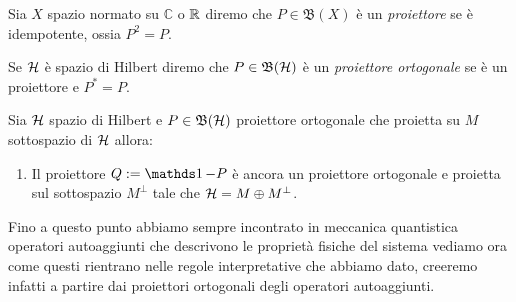 \begin{definition}
Sia $X$ spazio normato su $\mathbb{C}$ o $\operatorname{\mathbb{R}}$ diremo che $P \in \mathfrak{B}(X)$ è un \emph{proiettore} se è idempotente, ossia $P^2 = P$.
\end{definition}

\begin{definition}
    Se $\operatorname{\mathcal{H}}$ è spazio di Hilbert diremo che $P \in \mathfrak{B}(\operatorname{\mathcal{H}})$ è un \emph{proiettore ortogonale} se è un proiettore e $P^* = P$.
\end{definition}

\begin{proposition}
    Sia $\operatorname{\mathcal{H}}$ spazio di Hilbert e $P \in \mathfrak{B}(\operatorname{\mathcal{H}})$ proiettore ortogonale che proietta su $M$ sottospazio di $\operatorname{\mathcal{H}}$ allora: 
\begin{enumerate}
    \item Il proiettore $Q:= \un - P$ è ancora un proiettore ortogonale e proietta sul sottospazio $M^\perp$ tale che $\operatorname{\mathcal{H}} = M \oplus M^\perp$.
\end{enumerate} 
\end{proposition}

Fino a questo punto abbiamo sempre incontrato in meccanica quantistica operatori autoaggiunti che descrivono le proprietà fisiche del sistema vediamo ora come questi rientrano nelle regole interpretative che abbiamo dato, creeremo infatti a partire dai proiettori ortogonali degli operatori autoaggiunti. 


